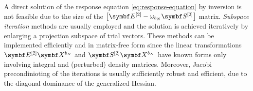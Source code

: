 A direct solution of the response equation \eqref{eq:response-equation} by inversion
is not feasible due to the size of the $\left[\genHessian -
\omega_{b_N}\genMetric \right]$ matrix. \emph{Subspace iteration}
methods are usually employed and the solution is achieved iteratively
by enlarging a projection subspace of trial vectors.\autocite{Saad2003-oa,
Saad2011-gm, Kauczor2011-rd, Malmqvist2013-vw}
These methods can be implemented efficiently and in matrix-free form
since the linear transformations $\genHessian\rspParam{b_N}$ and
$\genMetric\rspParam{b_N}$ have known forms only involving integral and
(perturbed) density matrices.
Moreover, Jacobi precondinioting of the iterations is usually sufficiently
robust and efficient, due to the diagonal dominance of the generalized
Hessian.

